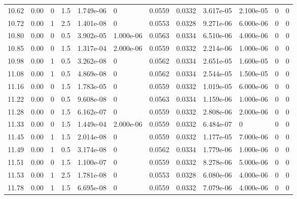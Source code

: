\documentclass[preview]{standalone}
\begin{document}
{{{\begin{tabular}{L{1.2cm}C{1.2cm} C{0.3cm}C{0.5cm} C{1.4cm}C{1.4cm} C{1.4cm}C{1.4cm} C{1.6cm}C{1.6cm} C{1.6cm}C{1.6cm}}
  10.62  &  0.00  & 0     & 1.5 &  1.749e-06  & 0  &  0.0559&   0.0332& 3.617e-05 & 2.100e-05   &  0 & 0  \\ 
  10.72  &  0.00  & 1     & 2.5 &  1.401e-08  & 0  &  0.0553&   0.0328& 9.271e-06 & 6.000e-06   &  0 & 0  \\ 
  10.80  &  0.00  & 0     & 0.5 &  3.902e-05  & 1.000e-06  &  0.0563&   0.0334& 6.510e-06 & 4.000e-06   &  0 & 0  \\ 
  10.85  &  0.00  & 0     & 1.5 &  1.317e-04  & 2.000e-06  &  0.0559&   0.0332& 2.214e-06 & 1.000e-06   &  0 & 0  \\ 
  10.98  &  0.00  & 1     & 0.5 &  3.262e-08  & 0  &  0.0562&   0.0334& 2.651e-05 & 1.600e-05   &  0 & 0  \\ 
  11.08  &  0.00  & 1     & 0.5 &  4.869e-08  & 0  &  0.0562&   0.0334& 2.544e-05 & 1.500e-05   &  0 & 0  \\ 
  11.16  &  0.00  & 0     & 1.5 &  1.783e-05  & 0  &  0.0559&   0.0332& 1.019e-05 & 6.000e-06   &  0 & 0  \\ 
  11.22  &  0.00  & 0     & 0.5 &  9.608e-08  & 0  &  0.0563&   0.0334& 1.159e-06 & 1.000e-06   &  0 & 0  \\ 
  11.28  &  0.00  & 0     & 1.5 &  6.162e-07  & 0  &  0.0559&   0.0332& 2.808e-06 & 2.000e-06   &  0 & 0  \\ 
  11.33  &  0.00  & 0     & 1.5 &  1.449e-04  & 2.000e-06  &  0.0559&   0.0332& 6.484e-07 & 0   &  0 & 0  \\ 
  11.45  &  0.00  & 1     & 1.5 &  2.014e-08  & 0  &  0.0559&   0.0332& 1.177e-05 & 7.000e-06   &  0 & 0  \\ 
  11.49  &  0.00  & 1     & 0.5 &  3.174e-08  & 0  &  0.0562&   0.0334& 1.779e-06 & 1.000e-06   &  0 & 0  \\ 
  11.51  &  0.00  & 0     & 1.5 &  1.100e-07  & 0  &  0.0559&   0.0332& 8.278e-06 & 5.000e-06   &  0 & 0  \\ 
  11.53  &  0.00  & 1     & 2.5 &  1.781e-08  & 0  &  0.0553&   0.0328& 6.080e-06 & 4.000e-06   &  0 & 0  \\ 
  11.78  &  0.00  & 1     & 1.5 &  6.695e-08  & 0  &  0.0559&   0.0332& 7.079e-06 & 4.000e-06   &  0 & 0  \\ 
\hline 
\end{tabular} 

}}}
\end{document}
